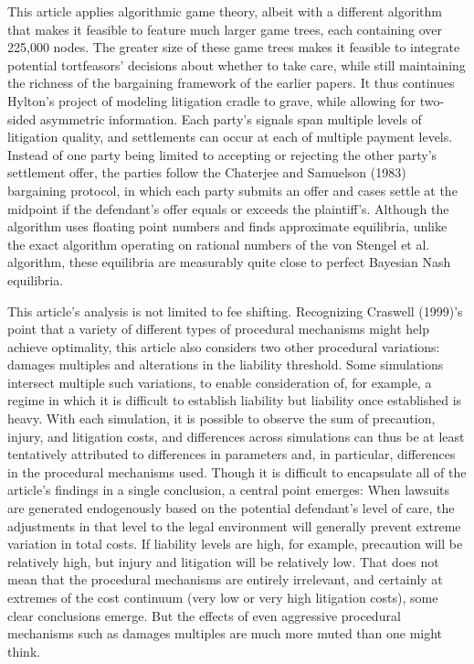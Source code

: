 \documentclass{article}
\begin{document}
This article applies algorithmic game theory, albeit with a different algorithm that makes it feasible to feature much larger game trees, each containing over 225,000 nodes. The greater size of these game trees makes it feasible to integrate potential tortfeasors' decisions about whether to take care, while still maintaining the richness of the bargaining framework of the earlier papers. It thus continues Hylton's project of modeling litigation cradle to grave, while allowing for two-sided asymmetric information. Each party's signals span multiple levels of litigation quality, and settlements can occur at each of multiple payment levels. Instead of one party being limited to accepting or rejecting the other party's settlement offer, the parties follow the Chaterjee and Samuelson (1983) bargaining protocol, in which each party submits an offer and cases settle at the midpoint if the defendant's offer equals or exceeds the plaintiff's. Although the algorithm uses floating point numbers and finds approximate equilibria, unlike the exact algorithm operating on rational numbers of the von Stengel et al. algorithm, these equilibria are measurably quite close to perfect Bayesian Nash equilibria. 

This article's analysis is not limited to fee shifting. Recognizing Craswell (1999)'s point that a variety of different types of procedural mechanisms might help achieve optimality, this article also considers two other procedural variations: damages multiples and alterations in the liability threshold. Some simulations intersect multiple such variations, to enable consideration of, for example, a regime in which it is difficult to establish liability but liability once established is heavy. With each simulation, it is possible to observe the sum of precaution, injury, and litigation costs, and differences across simulations can thus be at least tentatively attributed to differences in parameters and, in particular, differences in the procedural mechanisms used. Though it is difficult to encapsulate all of the article's findings in a single conclusion, a central point emerges: When lawsuits are generated endogenously based on the potential defendant's level of care, the adjustments in that level to the legal environment will generally prevent extreme variation in total costs. If liability levels are high, for example, precaution will be relatively high, but injury and litigation will be relatively low. That does not mean that the procedural mechanisms are entirely irrelevant, and certainly at extremes of the cost continuum (very low or very high litigation costs), some clear conclusions emerge. But the effects of even aggressive procedural mechanisms such as damages multiples are much more muted than one might think. 
\end{document}
